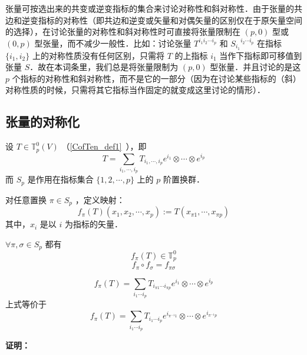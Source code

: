 
\begin{issues}
\issueTODO
\end{issues}


张量可按选出来的共变或逆变指标的集合来讨论对称性和斜对称性．由于张量的共边和逆变指标的对称性（即共边和逆变或矢量和对偶矢量的区别仅在于原矢量空间的选择），在讨论张量的对称性和斜对称性时可直接将张量限制在 $(p,0)$ 型或 $(0,p)$ 型张量，而不减少一般性．比如：讨论张量 $T^{i_1 i_2\cdots i_p}$ 和 ${S_{i_1}}^{i_2\cdots i_p}$ 在指标 $\{i_1,i_2\}$ 上的对称性质没有任何区别，只需将 $T$ 的上指标 $i_1$ 当作下指标即可移值到张量 $S$．故在本词条里，我们总是将张量限制为 $(p,0)$ 型张量．并且讨论的是这 $p$ 个指标的对称性和斜对称性，而不是它的一部分（因为在讨论某些指标的（斜）对称性质的时候，只需将其它指标当作固定的就变成这里讨论的情形）．
\subsection{张量的对称化}
设 $T\in \mathbb{T}_p^0(V)$ （\autoref{CofTen_def1}~），即
\begin{equation}
T=\sum_{i_1,\cdots,i_p}T_{i_1,\cdots,i_p}e^{i_1}\otimes\cdots\otimes e^{i_p}
\end{equation}
而 $S_p$ 是作用在指标集合 $\{1,2,\cdots,p\}$ 上的 $p$ 阶置换群．

对任意置换 $\pi\in S_p$ ，定义映射：
\begin{equation}\label{SIofTe_eq1}
f_\pi(T)(x_1,x_2,\cdots,x_p):=T(x_{\pi1},\cdots,x_{\pi p})
\end{equation}
其中，$x_i$ 是以 $i$ 为指标的矢量．

\begin{theorem}{}
$\forall \pi,\sigma\in S_p$ 都有 
\begin{equation}
f_{\pi}(T)\in\mathbb{T}_p^0
\end{equation}
\begin{equation}\label{SIofTe_eq6}
f_\pi \circ f_\sigma=f_{\pi\sigma}
\end{equation}

\begin{equation}\label{SIofTe_eq2}
f_{\pi}(T)=\sum_{i_1\cdots i_p}T_{i_{\pi1}\cdots i_{\pi p}}e^{i_1}\otimes\cdots\otimes e^{i_p}
\end{equation}
上式等价于
\begin{equation}\label{SIofTe_eq3}
f_{\pi}(T)=\sum_{i_1\cdots i_p}T_{i_1\cdots i_p}e^{i_{\pi^{-1}1}}\otimes\cdots\otimes e^{i_{\pi^{-1}p}}
\end{equation}
\end{theorem}
\textbf{证明：}

